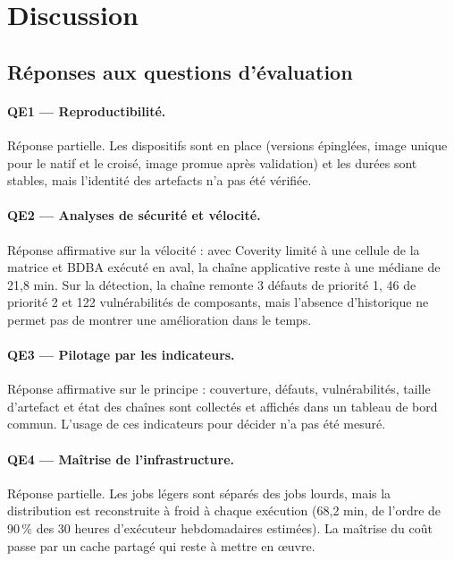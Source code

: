 \section{Discussion}
\label{sec:eval-discussion}

\subsection{Réponses aux questions d'évaluation}

\paragraph{QE1 --- Reproductibilité.} Réponse partielle. Les dispositifs sont en
place (versions épinglées, image unique pour le natif et le croisé, image
promue après validation) et les durées sont stables, mais l'identité des
artefacts n'a pas été vérifiée.

\paragraph{QE2 --- Analyses de sécurité et vélocité.} Réponse affirmative sur
la vélocité : avec Coverity limité à une cellule de la matrice et BDBA exécuté
en aval, la chaîne applicative reste à une médiane de 21,8 min. Sur la
détection, la chaîne remonte 3 défauts de priorité 1, 46 de priorité 2 et 122
vulnérabilités de composants, mais l'absence d'historique ne permet pas de
montrer une amélioration dans le temps.

\paragraph{QE3 --- Pilotage par les indicateurs.} Réponse affirmative sur le
principe : couverture, défauts, vulnérabilités, taille d'artefact et état des
chaînes sont collectés et affichés dans un tableau de bord commun. L'usage de
ces indicateurs pour décider n'a pas été mesuré.

\paragraph{QE4 --- Maîtrise de l'infrastructure.} Réponse partielle. Les jobs
légers sont séparés des jobs lourds, mais la distribution est reconstruite à
froid à chaque exécution (68,2 min, de l'ordre de 90\,\% des 30 heures
d'exécuteur hebdomadaires estimées). La maîtrise du coût passe par un cache
partagé qui reste à mettre en œuvre.



